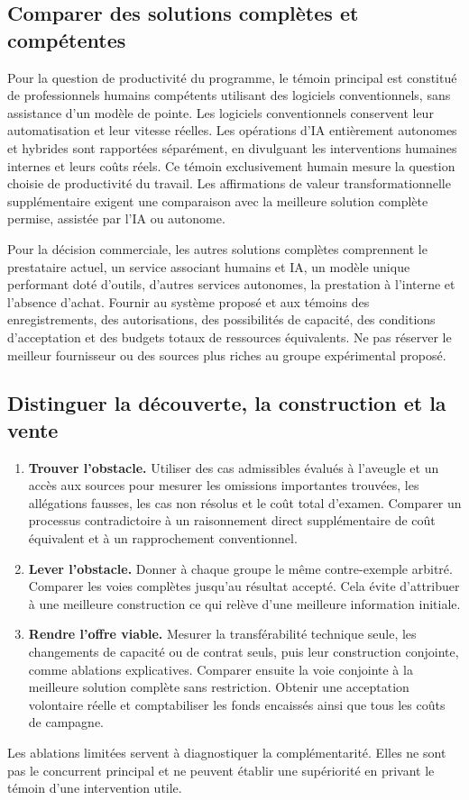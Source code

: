 \documentclass[11pt,a4paper]{article}
\begin{document}
\subsection{Comparer des solutions complètes et compétentes}
Pour la question de productivité du programme, le témoin principal est constitué de professionnels humains compétents utilisant des logiciels conventionnels, sans assistance d’un modèle de pointe. Les logiciels conventionnels conservent leur automatisation et leur vitesse réelles. Les opérations d’IA entièrement autonomes et hybrides sont rapportées séparément, en divulguant les interventions humaines internes et leurs coûts réels. Ce témoin exclusivement humain mesure la question choisie de productivité du travail. Les affirmations de valeur transformationnelle supplémentaire exigent une comparaison avec la meilleure solution complète permise, assistée par l’IA ou autonome.

Pour la décision commerciale, les autres solutions complètes comprennent le prestataire actuel, un service associant humains et IA, un modèle unique performant doté d’outils, d’autres services autonomes, la prestation à l’interne et l’absence d’achat. Fournir au système proposé et aux témoins des enregistrements, des autorisations, des possibilités de capacité, des conditions d’acceptation et des budgets totaux de ressources équivalents. Ne pas réserver le meilleur fournisseur ou des sources plus riches au groupe expérimental proposé.

\subsection{Distinguer la découverte, la construction et la vente}
\begin{enumerate}
\item \textbf{Trouver l’obstacle.} Utiliser des cas admissibles évalués à l’aveugle et un accès aux sources pour mesurer les omissions importantes trouvées, les allégations fausses, les cas non résolus et le coût total d’examen. Comparer un processus contradictoire à un raisonnement direct supplémentaire de coût équivalent et à un rapprochement conventionnel.
\item \textbf{Lever l’obstacle.} Donner à chaque groupe le même contre-exemple arbitré. Comparer les voies complètes jusqu’au résultat accepté. Cela évite d’attribuer à une meilleure construction ce qui relève d’une meilleure information initiale.
\item \textbf{Rendre l’offre viable.} Mesurer la transférabilité technique seule, les changements de capacité ou de contrat seuls, puis leur construction conjointe, comme ablations explicatives. Comparer ensuite la voie conjointe à la meilleure solution complète sans restriction. Obtenir une acceptation volontaire réelle et comptabiliser les fonds encaissés ainsi que tous les coûts de campagne.
\end{enumerate}
Les ablations limitées servent à diagnostiquer la complémentarité. Elles ne sont pas le concurrent principal et ne peuvent établir une supériorité en privant le témoin d’une intervention utile.
\end{document}
